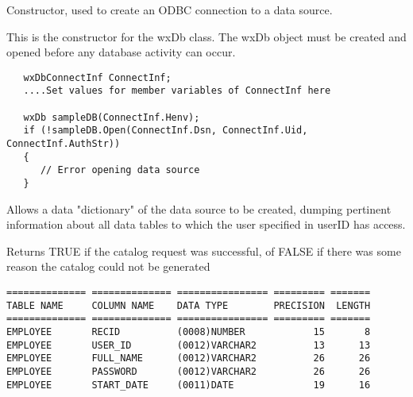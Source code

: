 Constructor, used to create an ODBC connection to a data source.





This is the constructor for the wxDb class.  The wxDb object must
be created and opened before any database activity can occur.


\begin{verbatim}
   wxDbConnectInf ConnectInf;
   ....Set values for member variables of ConnectInf here

   wxDb sampleDB(ConnectInf.Henv);
   if (!sampleDB.Open(ConnectInf.Dsn, ConnectInf.Uid, ConnectInf.AuthStr))
   {
      // Error opening data source
   }
\end{verbatim}


\label{wxdbcatalog}


Allows a data "dictionary" of the data source to be created, dumping pertinent information about all data tables to which the user specified in userID has access. 





Returns TRUE if the catalog request was successful, of FALSE if there was some reason the catalog could not be generated


\begin{verbatim}
============== ============== ================ ========= =======
TABLE NAME     COLUMN NAME    DATA TYPE        PRECISION  LENGTH
============== ============== ================ ========= =======
EMPLOYEE       RECID          (0008)NUMBER            15       8
EMPLOYEE       USER_ID        (0012)VARCHAR2          13      13
EMPLOYEE       FULL_NAME      (0012)VARCHAR2          26      26
EMPLOYEE       PASSWORD       (0012)VARCHAR2          26      26
EMPLOYEE       START_DATE     (0011)DATE              19      16
\end{verbatim}


